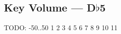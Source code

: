 \subsection{Key Volume --- \UiKey{\I}\UiKey{\SET}D$\flat$5}









































TODO: -50..50
1
2
3
4
5
6
7
8
9
10
11

